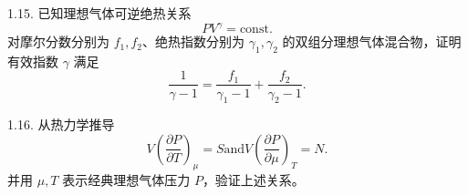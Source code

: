 1.15. 已知理想气体可逆绝热关系
\begin{equation}\tag{1.3.75}\label{eq:1.3.75}
P V ^{\gamma} = \mathrm { c o n s t . }
\end{equation}
对摩尔分数分别为 \(f_1,f_2\)、绝热指数分别为 \(\gamma_1,\gamma_2\) 的双组分理想气体混合物，证明有效指数 \(\gamma\) 满足
\begin{equation}\tag{1.3.76}\label{eq:1.3.76}
\frac { 1 } { \gamma - 1 } = \frac { f _ { 1 } } { \gamma _ { 1 } - 1 } + \frac { f _ { 2 } } { \gamma _ { 2 } - 1 } .
\end{equation}

1.16. 从热力学推导
\begin{equation}\tag{1.3.77}\label{eq:1.3.77}
V \left( \frac { \partial P } { \partial T } \right) _ { \mu } = S  \mathrm { a n d }  V \left( \frac { \partial P } { \partial \mu } \right) _ { T } = N .
\end{equation}
并用 \(\mu,T\) 表示经典理想气体压力 \(P\)，验证上述关系。


